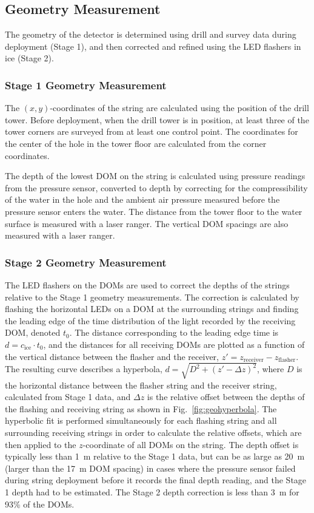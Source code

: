\subsection{Geometry Measurement}

The geometry of the detector is determined using drill and survey data
during deployment (Stage 1), and then corrected and refined using the LED
flashers in ice (Stage 2).

\subsubsection{Stage 1 Geometry Measurement}
The $(x,y)$-coordinates of the string are calculated using the position of
the drill tower. Before deployment, when the drill tower is in position, at
least three of the tower corners are surveyed from at least one control
point.  The coordinates for the center of the hole in the tower floor are
calculated from the corner coordinates.

The depth of the lowest DOM on the string is calculated using pressure
readings from the pressure sensor, converted to depth by correcting for the
compressibility of the water in the hole and the ambient air pressure
measured before the pressure sensor enters the water. The distance from the
tower floor to the water surface is measured with a laser ranger. The
vertical DOM spacings are also measured with a laser ranger.

\subsubsection{Stage 2 Geometry Measurement}

The LED flashers on the DOMs are used to correct the depths of the strings relative to
the Stage 1 geometry measurements. The correction is calculated by flashing
the horizontal LEDs on a DOM at the surrounding strings and finding the
leading edge of the time distribution of the light recorded by the
receiving DOM, denoted $t_0$. The distance corresponding to the leading
edge time is $d = c_{\mathrm{ice}} \cdot t_0$, and the distances for all receiving
DOMs are plotted as a function of the vertical distance between the flasher
and the receiver, $z' = z_{\mathrm{receiver}} - z_{\mathrm{flasher}}$. The resulting curve
describes a hyperbola, $d = \sqrt{D^2 + (z' -\Delta z)^2}$, where $D$ is
the horizontal distance between the flasher string and the receiver string,
calculated from Stage 1 data, and $\Delta z$ is the relative offset between
the depths of the flashing and receiving string as shown in
Fig.~\ref{fig:geohyperbola}. The hyperbolic fit is performed simultaneously for
each flashing string and all surrounding receiving strings in order to
calculate the relative offsets, which are then applied to the $z$-coordinate
of all DOMs on the string. The depth offset is typically less than 1~m
relative to the Stage 1 data, but can be as large as 20~m (larger than the
17~m DOM spacing) in cases where the pressure sensor failed during string
deployment before it records the final depth reading, and the Stage 1 depth
had to be estimated. The Stage 2 depth correction is less than 3~m for 93\%
of the DOMs.


